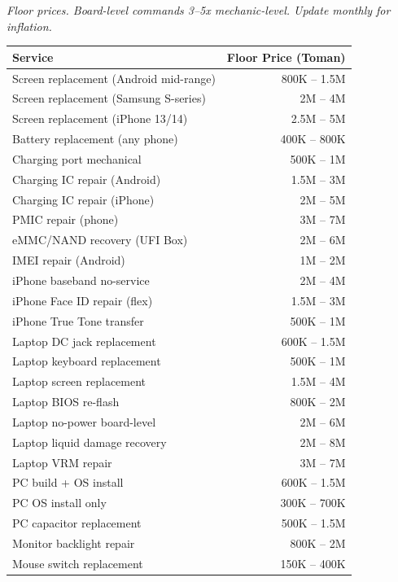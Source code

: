 \vspace{0.5cm}

{\small\itshape\color{arligray} Floor prices. Board-level commands 3--5x mechanic-level. Update monthly for inflation.}

\vspace{0.2cm}
\noindent
\begin{tabular}{@{}p{7cm} r@{}}
\toprule
\textbf{\color{arliznavy}Service} & \textbf{\color{arlizblue}Floor Price (Toman)} \\
\midrule
Screen replacement (Android mid-range) & 800K -- 1.5M \\
Screen replacement (Samsung S-series) & 2M -- 4M \\
Screen replacement (iPhone 13/14) & 2.5M -- 5M \\
Battery replacement (any phone) & 400K -- 800K \\
Charging port mechanical & 500K -- 1M \\
Charging IC repair (Android) & 1.5M -- 3M \\
Charging IC repair (iPhone) & 2M -- 5M \\
PMIC repair (phone) & 3M -- 7M \\
eMMC/NAND recovery (UFI Box) & 2M -- 6M \\
IMEI repair (Android) & 1M -- 2M \\
iPhone baseband no-service & 2M -- 4M \\
iPhone Face ID repair (flex) & 1.5M -- 3M \\
iPhone True Tone transfer & 500K -- 1M \\
\midrule
Laptop DC jack replacement & 600K -- 1.5M \\
Laptop keyboard replacement & 500K -- 1M \\
Laptop screen replacement & 1.5M -- 4M \\
Laptop BIOS re-flash & 800K -- 2M \\
Laptop no-power board-level & 2M -- 6M \\
Laptop liquid damage recovery & 2M -- 8M \\
Laptop VRM repair & 3M -- 7M \\
\midrule
PC build + OS install & 600K -- 1.5M \\
PC OS install only & 300K -- 700K \\
PC capacitor replacement & 500K -- 1.5M \\
Monitor backlight repair & 800K -- 2M \\
Mouse switch replacement & 150K -- 400K \\
\bottomrule
\end{tabular}